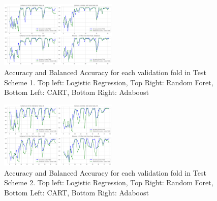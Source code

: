 \documentclass[11pt, letterpaper, journal]{IEEEtran}
\begin{document}
\begin{figure}[h]
\centering
\includegraphics[width=0.5\textwidth]{statics/test_Scheme_1_Fold_error.png}
\caption{Accuracy and Balanced Accuracy for each validation fold in Test Scheme 1. Top left: Logistic Regression, Top Right: Random Foret, Bottom Left: CART, Bottom Right: Adaboost}
\label{fig:fold_results_1}
\end{figure}

\begin{figure}[h]
\centering
\includegraphics[width=0.5\textwidth]{statics/test_Scheme2_fold_error.png}
\caption{Accuracy and Balanced Accuracy for each validation fold in Test Scheme 2. Top left: Logistic Regression, Top Right: Random Foret, Bottom Left: CART, Bottom Right: Adaboost}
\label{fig:fold_results_2}
\end{figure}
\end{document}
